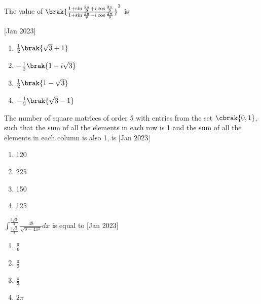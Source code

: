     \item{
	        	The value of $\brak{\frac{1 + \sin{\frac{2\pi}{9}}+ i\cos{\frac{2\pi}{9}}}{1 + \sin{\frac{2\pi}{9}}- i\cos{\frac{2\pi}{9}}}}^3$ is 
            
             \hfill
                {[Jan 2023]}
            \begin{multicols}{2}
                \begin{enumerate}
                	\item $\frac{1}{2}\brak{\sqrt{3}+1}$
                	\item $-\frac{1}{2}\brak{1-i\sqrt{3}}$
                	\item $\frac{1}{2}\brak{1-\sqrt{3}}$
                	\item $-\frac{1}{2}\brak{\sqrt{3}-1}$
                \end{enumerate}
            \end{multicols}
        
        }
    \item{
    		
    		The number of square matrices of order 5 with entries from the set $\cbrak{0, 1}$, such that the sum of all the elements in each row is 1 and the sum of all the elements in each column is also 1, is 
             \hfill
                {[Jan 2023]}
			\begin{multicols}{2}
				\begin{enumerate}
					\item 120
					\item 225
					\item 150
					\item 125
				\end{enumerate}
			\end{multicols}
        
        }
    \item{
        	$\int_{\frac{3\sqrt{2}}{4}}^ \frac{3\sqrt{3}}{4} \frac{48}{\sqrt{9-4x^2}}dx$ is equal to \hfill
                {[Jan 2023]}
				\begin{multicols}{4}
	                \begin{enumerate}
	                	\item $\frac{\pi}{6}$
	                	\item $\frac{\pi}{2}$
	                	\item $\frac{\pi}{3}$
	                	\item $2\pi$
	                \end{enumerate}
				\end{multicols}
        
        }
